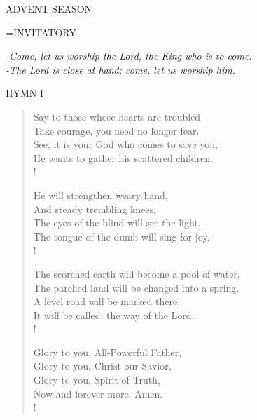 \begin{center}\normalsize ADVENT SEASON\\
\end{center}

\hangindent=\parindent \small{INVITATORY}
\begin{center}
\textit{-Come, let us worship the Lord, the King who is to come.\\}
\textit{-The Lord is close at hand; come, let us worship him.\\}
\end{center}

\noindent\small{\uppercase{Hymn I }}\normalsize\label{advent:firstHymn}
\begin{verse}
Say to those whose hearts are troubled\\
Take courage, you need no longer fear.\\
See, it is your God who comes to save you,\\
He wants to gather his scattered children.\\!

He will strengthen weary hand,\\
And steady trembling knees,\\
The eyes of the blind will see the light,\\
The tongue of the dumb will sing for joy.\\!

The scorched earth will become a pool of water,\\
The parched land will be changed into a spring.\\
A level road will be marked there,\\
It will be called: the way of the Lord.\\!

Glory to you, All-Powerful Father,\\
Glory to you, Christ our Savior,\\
Glory to you, Spirit of Truth,\\
Now and forever more. Amen.\\!
\end{verse}

